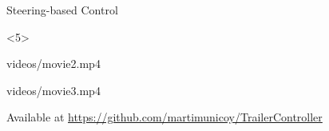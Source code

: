 \begin{frame}{Steering-based Control}
\begin{onlyenv}<5>
\begin{minipage}{.5\textwidth}
        {videos/movie2.mp4}
\end{minipage}%
\begin{minipage}{.5\textwidth}
        {videos/movie3.mp4}
\end{minipage}

\footnotesize{Available at \url{https://github.com/martimunicoy/TrailerController}}

\end{onlyenv}

\end{frame}